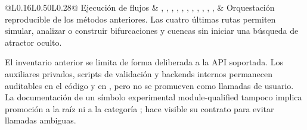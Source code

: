 \begin{center}
\begin{longtable}{@{}L{0.16\textwidth}L{0.50\textwidth}L{0.28\textwidth}@{}}
Ejecución de flujos &
,
,
,
,
,
,
,
,
,
,
,
&
Orquestación reproducible de los métodos anteriores. Las cuatro últimas rutas
permiten simular, analizar o construir bifurcaciones y cuencas sin iniciar una
búsqueda de atractor oculto. \\
\bottomrule
\end{longtable}
\end{center}

El inventario anterior se limita de forma deliberada a la API soportada. Los
auxiliares privados, scripts de validación y backends internos permanecen
auditables en el código y en , pero no se
promueven como llamadas de usuario. La documentación de un símbolo experimental
module-qualified tampoco implica promoción a la raíz ni a la categoría
\STABLE; hace visible su contrato para evitar llamadas ambiguas.
